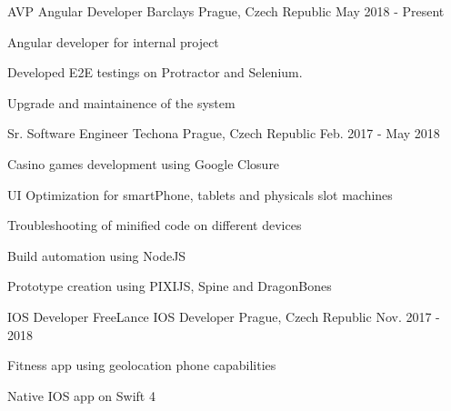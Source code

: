 
\begin{cventries}

    \cventry
    {AVP Angular Developer} %
    {Barclays} %
    {Prague, Czech Republic} %
    {May 2018 - Present} %
    {
    \begin{cvitems} %
        \item {Angular developer for internal project}
        \item {Developed E2E testings on Protractor and Selenium.}
        \item {Upgrade and maintainence of the system}
    \end{cvitems}
    }

    \cventry
    {Sr. Software Engineer} %
    {Techona} %
    {Prague, Czech Republic} %
    {Feb. 2017 - May 2018} %
    {
    \begin{cvitems} %
        \item {Casino games development using Google Closure}
        \item {UI Optimization for smartPhone, tablets and physicals slot machines}
        \item {Troubleshooting of minified code on different devices}
        \item {Build automation using NodeJS}
        \item {Prototype creation using PIXIJS, Spine and DragonBones}
    \end{cvitems}
    }

    \cventry
    {IOS Developer} %
    {FreeLance IOS Developer} %
    {Prague, Czech Republic} %
    {Nov. 2017 - 2018} %
    {
    \begin{cvitems} %
        \item {Fitness app using geolocation phone capabilities}
        \item {Native IOS app on Swift 4}
    \end{cvitems}
    }


\end{cventries}
